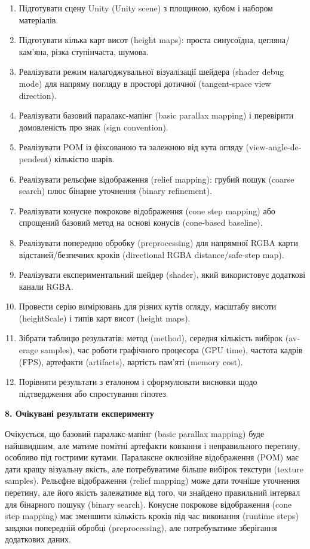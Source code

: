 \documentclass[14pt,a4paper]{extarticle}
\newcommand{\eng}[1]{\foreignlanguage{english}{#1}}
\newcommand{\sectiontitle}[1]{%
  \par\vspace{\baselineskip}%
  \noindent\textbf{#1}\par
}
\begin{document}
\begin{enumerate}
  \item Підготувати сцену Unity (\eng{Unity scene}) з площиною, кубом і набором матеріалів.
  \item Підготувати кілька карт висот (\eng{height maps}): проста синусоїдна, цегляна/кам'яна, різка ступінчаста, шумова.
  \item Реалізувати режим налагоджувальної візуалізації шейдера (\eng{shader debug mode}) для напряму погляду в просторі дотичної (\eng{tangent-space view direction}).
  \item Реалізувати базовий паралакс-мапінг (\eng{basic parallax mapping}) і перевірити домовленість про знак (\eng{sign convention}).
  \item Реалізувати POM із фіксованою та залежною від кута огляду (\eng{view-angle-dependent}) кількістю шарів.
  \item Реалізувати рельєфне відображення (\eng{relief mapping}): грубий пошук (\eng{coarse search}) плюс бінарне уточнення (\eng{binary refinement}).
  \item Реалізувати конусне покрокове відображення (\eng{cone step mapping}) або спрощений базовий метод на основі конусів (\eng{cone-based baseline}).
  \item Реалізувати попередню обробку (\eng{preprocessing}) для напрямної RGBA карти відстаней/безпечних кроків (\eng{directional RGBA distance/safe-step map}).
  \item Реалізувати експериментальний шейдер (\eng{shader}), який використовує додаткові канали RGBA.
  \item Провести серію вимірювань для різних кутів огляду, масштабу висоти (\eng{heightScale}) і типів карт висот (\eng{height maps}).
  \item Зібрати таблицю результатів: метод (\eng{method}), середня кількість вибірок (\eng{average samples}), час роботи графічного процесора (\eng{GPU time}), частота кадрів (FPS), артефакти (\eng{artifacts}), вартість пам'яті (\eng{memory cost}).
  \item Порівняти результати з еталоном і сформулювати висновки щодо підтвердження або спростування гіпотез.
\end{enumerate}

\sectiontitle{8. Очікувані результати експерименту}

Очікується, що базовий паралакс-мапінг (\eng{basic parallax mapping}) буде найшвидшим, але матиме помітні артефакти ковзання і неправильного перетину, особливо під гострими кутами. Паралаксне оклюзійне відображення (POM) має дати кращу візуальну якість, але потребуватиме більше вибірок текстури (\eng{texture samples}). Рельєфне відображення (\eng{relief mapping}) може дати точніше уточнення перетину, але його якість залежатиме від того, чи знайдено правильний інтервал для бінарного пошуку (\eng{binary search}). Конусне покрокове відображення (\eng{cone step mapping}) має зменшити кількість кроків під час виконання (\eng{runtime steps}) завдяки попередній обробці (\eng{preprocessing}), але потребуватиме зберігання додаткових даних.
\end{document}
